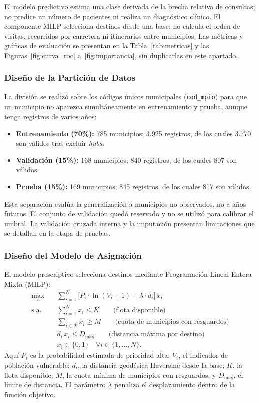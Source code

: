 \documentclass[12pt]{article}
\begin{document}
El modelo predictivo estima una clase derivada de la brecha relativa de consultas; no predice un número de pacientes ni realiza un diagnóstico clínico. El componente MILP selecciona destinos desde una base: no calcula el orden de visitas, recorridos por carretera ni itinerarios entre municipios. Las métricas y gráficas de evaluación se presentan en la Tabla~\ref{tab:metricas} y las Figuras~\ref{fig:curva_roc} a~\ref{fig:importancia}, sin duplicarlas en este apartado.

\subsubsection{Diseño de la Partición de Datos}
La división se realizó sobre los códigos únicos municipales (\texttt{cod\_mpio}) para que un municipio no aparezca simultáneamente en entrenamiento y prueba, aunque tenga registros de varios años:
\begin{itemize}
    \item \textbf{Entrenamiento (70\%):} 785 municipios; 3.925 registros, de los cuales 3.770 son válidos tras excluir \textit{hubs}.
    \item \textbf{Validación (15\%):} 168 municipios; 840 registros, de los cuales 807 son válidos.
    \item \textbf{Prueba (15\%):} 169 municipios; 845 registros, de los cuales 817 son válidos.
\end{itemize}
Esta separación evalúa la generalización a municipios no observados, no a años futuros. El conjunto de validación quedó reservado y no se utilizó para calibrar el umbral. La validación cruzada interna y la imputación presentan limitaciones que se detallan en la etapa de pruebas.

\subsubsection{Diseño del Modelo de Asignación}
El modelo prescriptivo selecciona destinos mediante Programación Lineal Entera Mixta (MILP):
\begin{equation}
\begin{aligned}
\max_{x}\quad & \sum_{i=1}^{N}\Big[P_i\cdot\ln(V_i+1)-\lambda\cdot d_i\Big]\,x_i \\[5pt]
\text{s.a.}\quad & \sum_{i=1}^{N}x_i \le K \qquad \text{(flota disponible)}\\
& \sum_{i\in\mathcal{R}}x_i \ge M \qquad \text{(cuota de municipios con resguardos)}\\
& d_i\,x_i \le D_{\max} \qquad \text{(distancia máxima por destino)}\\
& x_i\in\{0,1\}\quad \forall i\in\{1,\dots,N\}.
\end{aligned}
\label{eq:milp}
\end{equation}
Aquí $P_i$ es la probabilidad estimada de prioridad alta; $V_i$, el indicador de población vulnerable; $d_i$, la distancia geodésica Haversine desde la base; $K$, la flota disponible; $M$, la cuota mínima de municipios con resguardos; y $D_{\max}$, el límite de distancia. El parámetro $\lambda$ penaliza el desplazamiento dentro de la función objetivo.
\end{document}
